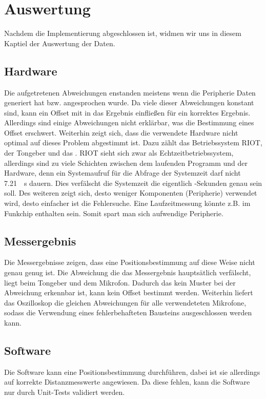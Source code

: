 \newpage
\section{Auswertung}

Nachdem die Implementierung abgeschlossen ist, widmen wir uns in diesem Kaptiel der Auswertung der Daten.

\subsection{Hardware}
Die aufgetretenen Abweichungen enstanden meistens wenn die Peripherie Daten generiert hat bzw. angesprochen wurde. Da viele dieser Abweichungen konstant sind, kann ein Offset mit in das Ergebnis einfließen für ein korrektes Ergebnis. Allerdings sind einige Abweichungen nicht erklärbar, was die Bestimmung eines Offset erschwert. Weiterhin zeigt sich, dass die verwendete Hardware nicht optimal auf dieses Problem abgestimmt ist. Dazu zählt das Betriebssystem RIOT, der Tongeber und das  \microphone . RIOT sieht sich zwar als Echtzeitbetriebssystem, allerdings sind zu viele Schichten zwischen dem laufenden Programm und der Hardware, denn ein Systemaufruf für die Abfrage der Systemzeit darf nicht \SI{7,21}{\mu s} dauern. Dies verfälscht die Systemzeit die eigentlich \si{\mu}-Sekunden genau sein soll. Des weiteren zeigt sich, desto weniger Komponenten (Peripherie) verwendet wird, desto einfacher ist die Fehlersuche. Eine Laufzeitmessung könnte z.B. im Funkchip enthalten sein. Somit spart man sich aufwendige Peripherie. 

\subsection{Messergebnis}
Die Messergebnisse zeigen, dass eine Positionsbestimmung auf diese Weise nicht genau genug ist. Die Abweichung die das Messergebnis hauptsätlich verfälscht, liegt beim Tongeber und dem Mikrofon. Dadurch das kein Muster bei der Abweichung erkennbar ist, kann kein Offset bestimmt werden. Weiterhin liefert das Oszilloskop die gleichen Abweichungen für alle verwendeteten Mikrofone, sodass die Verwendung eines fehlerbehafteten Bausteins ausgeschlossen werden kann. 

\subsection{Software}

Die Software kann eine Positionsbestimmung durchführen, dabei ist sie allerdings auf korrekte Distanzmesswerte angewiesen. Da diese fehlen, kann die Software nur durch Unit-Tests validiert werden.





